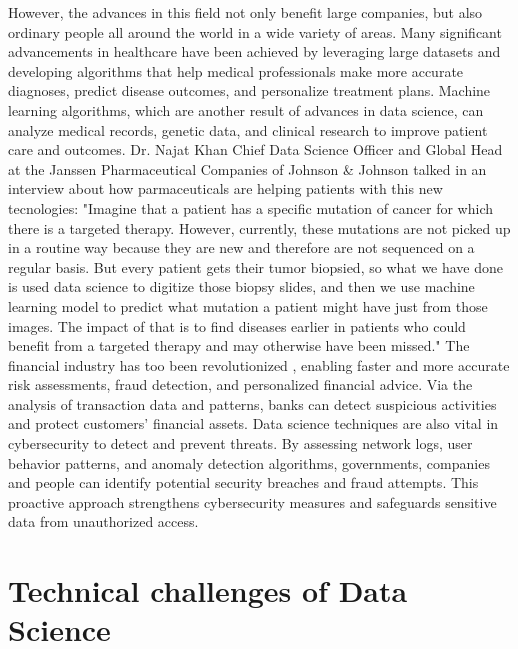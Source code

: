 \documentclass{vgtc}                          %
\begin{document}
However, the advances in this field not only benefit large companies, but also ordinary people all around the world in a wide variety of areas. Many significant advancements in 
healthcare have been achieved by leveraging large datasets and developing algorithms that help medical professionals make more accurate diagnoses, predict disease outcomes, and 
personalize treatment plans. Machine learning algorithms, which are another result of advances in data science, can analyze medical records, genetic data, and clinical research 
to improve patient care and outcomes. Dr. Najat Khan Chief Data Science Officer and Global Head at the Janssen Pharmaceutical Companies of Johnson \& Johnson talked in an interview 
about how parmaceuticals are helping patients with this new tecnologies: "Imagine that a patient has a specific mutation of cancer for which there is a targeted therapy. However, currently, 
these mutations are not picked up in a routine way because they are new and therefore are not sequenced on a regular basis. But every patient gets their tumor biopsied, so what we have 
done is used data science to digitize those biopsy slides, and then we use machine learning model to predict what mutation a patient might have just from those images. The impact of 
that is to find diseases earlier in patients who could benefit from a targeted therapy and may otherwise have been missed."\cite{Robinson:2022} The financial industry has too  been 
revolutionized , enabling faster and more accurate risk assessments, fraud detection, and personalized financial advice. Via the analysis of transaction data and patterns, banks can 
detect suspicious activities and protect customers' financial assets. Data science techniques are also vital in cybersecurity to detect and prevent threats. By assessing network logs, 
user behavior patterns, and anomaly detection algorithms, governments, companies and people can identify potential security breaches and fraud attempts. This proactive approach strengthens 
cybersecurity measures and safeguards sensitive data from unauthorized access.

\section{Technical challenges of Data Science}
\end{document}
